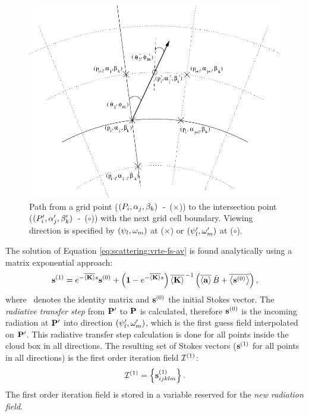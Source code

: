 \begin{figure}[t!]
  \centering\includegraphics[width=.8\hsize]{average}
  \caption{Path from a grid point ($(P_i, \alpha_j, \beta_k)$~-~($\times$)) to the intersection point ($(P_i', \alpha_j', \beta_k')$~-~($\circ$)) with the next grid cell boundary. Viewing direction is specified by $(\psi_l, \omega_m)$ at ($\times$) or $(\psi_l', \omega_m')$ at ($\circ$).}
  \label{fig:scattering:average}
\end{figure}

The solution of Equation \ref{eq:scattering:vrte-fs-av} is found analytically using
a matrix exponential approach: %
\begin{equation}
  {\bf s}^{(1)} =
  e^{-\overline{\left\langle {\bf K} \right\rangle}  s} {\bf s}^{(0)} + 
  \left( \mathbf{1} -  e^{-\overline{\left\langle {\bf K} \right\rangle} s} \right)
  \overline{\left\langle {\bf K} \right\rangle}^{\,-1} \left(\overline{\left\langle {\bf a} \right\rangle}\,
    \bar{B} + \overline{\left\langle {\bf s}^{(0)} \right\rangle} \right),
  \label{eq:scattering:VRTE_sol}
\end{equation}
where \IdnMtr\ denotes the identity matrix and ${\bf s}^{(0)}$ the
initial Stokes vector.  The \emph{radiative transfer step} from $\mathbf{P}'$ to $\mathbf{P}$ is calculated, therefore ${\bf s}^{(0)}$ is
the incoming radiation at $\mathbf{P}'$ into direction
$(\psi_l', \omega_m')$, which is the first guess field
interpolated on $\mathbf{P}'$.  This radiative transfer step
calculation is done for all points inside the cloud box in all
directions. The resulting set of Stokes vectors (${\bf s}^{(1)}$ for
all points in all directions) is the first order iteration field
${\mathcal I}^{(1)}$:
\begin{equation}
  {\mathcal I}^{(1)} = \left\{ {\bf s}^{(1)}_{ijklm}\right\}.  
\end{equation}
The first order iteration field is stored in a variable reserved for the 
\emph{new radiation field}. 

